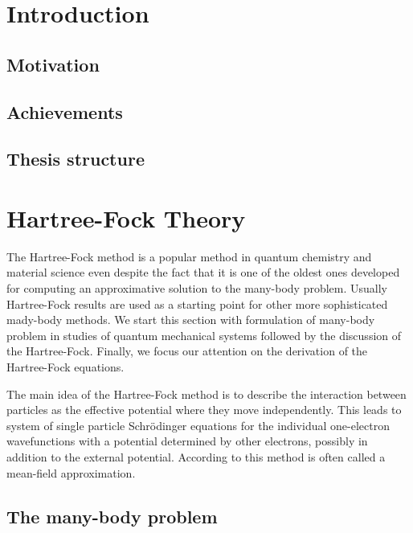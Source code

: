 \documentclass[twoside,english]{uiofysmaster}
\begin{document}
	\tableofcontents
	
\chapter{Introduction}
	
\section{Motivation }
\section{Achievements }
\section{Thesis structure}




\chapter{Hartree-Fock Theory}\label{Ch:HF}


The Hartree-Fock method is a popular method in quantum chemistry and material science even despite the fact that it is one of the oldest ones developed for computing an approximative solution to the many-body problem. Usually Hartree-Fock results are used as a starting point for other more sophisticated mady-body methods.
We start this section with formulation of many-body problem in studies of quantum mechanical systems followed by the discussion of the Hartree-Fock. Finally, we focus our attention on the derivation of the Hartree-Fock equations.

The main idea of the Hartree-Fock method is to describe the interaction between particles as the effective potential where they move independently. This leads to system of single particle Schr\"{o}dinger equations for the individual one-electron wavefunctions with a potential determined by other electrons, possibly in addition to the external potential. According to this method is often called a mean-field approximation.  \\
 



\section{The many-body problem}
\end{document}
